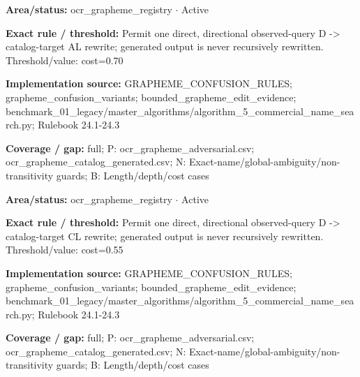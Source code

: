\begin{tcolorbox}[enhanced,breakable,colback=white,colframe=Muted!45,boxrule=0.45pt,arc=1.5pt,left=6pt,right=6pt,top=5pt,bottom=5pt,title={\texttt{OCR-GRAPHEME-D-TO-AL}},title after break={\texttt{OCR-GRAPHEME-D-TO-AL}\ (continued)},fonttitle=\headingfont\bfseries\color{Navy},coltitle=Navy]
\textbf{Area/status:} ocr\_\allowbreak{}grapheme\_\allowbreak{}registry $\boldsymbol{\cdot}$ Active\par
\smallskip
\textbf{Exact rule / threshold:} Permit one direct, directional observed-query D -> catalog-target AL rewrite; generated output is never recursively rewritten. Threshold/\allowbreak{}value: cost=0.70\par
\smallskip
\textbf{Implementation source:} GRAPHEME\_\allowbreak{}CONFUSION\_\allowbreak{}RULES; grapheme\_\allowbreak{}confusion\_\allowbreak{}variants; bounded\_\allowbreak{}grapheme\_\allowbreak{}edit\_\allowbreak{}evidence; benchmark\_\allowbreak{}01\_\allowbreak{}legacy/\allowbreak{}master\_\allowbreak{}algorithms/\allowbreak{}algorithm\_\allowbreak{}5\_\allowbreak{}commercial\_\allowbreak{}name\_\allowbreak{}search.py; Rulebook 24.1-24.3\par
\smallskip
\textbf{Coverage / gap:} full; P: ocr\_\allowbreak{}grapheme\_\allowbreak{}adversarial.csv; ocr\_\allowbreak{}grapheme\_\allowbreak{}catalog\_\allowbreak{}generated.csv; N: Exact-name/\allowbreak{}global-ambiguity/\allowbreak{}non-transitivity guards; B: Length/\allowbreak{}depth/\allowbreak{}cost cases
\end{tcolorbox}
\begin{tcolorbox}[enhanced,breakable,colback=white,colframe=Muted!45,boxrule=0.45pt,arc=1.5pt,left=6pt,right=6pt,top=5pt,bottom=5pt,title={\texttt{OCR-GRAPHEME-D-TO-CL}},title after break={\texttt{OCR-GRAPHEME-D-TO-CL}\ (continued)},fonttitle=\headingfont\bfseries\color{Navy},coltitle=Navy]
\textbf{Area/status:} ocr\_\allowbreak{}grapheme\_\allowbreak{}registry $\boldsymbol{\cdot}$ Active\par
\smallskip
\textbf{Exact rule / threshold:} Permit one direct, directional observed-query D -> catalog-target CL rewrite; generated output is never recursively rewritten. Threshold/\allowbreak{}value: cost=0.55\par
\smallskip
\textbf{Implementation source:} GRAPHEME\_\allowbreak{}CONFUSION\_\allowbreak{}RULES; grapheme\_\allowbreak{}confusion\_\allowbreak{}variants; bounded\_\allowbreak{}grapheme\_\allowbreak{}edit\_\allowbreak{}evidence; benchmark\_\allowbreak{}01\_\allowbreak{}legacy/\allowbreak{}master\_\allowbreak{}algorithms/\allowbreak{}algorithm\_\allowbreak{}5\_\allowbreak{}commercial\_\allowbreak{}name\_\allowbreak{}search.py; Rulebook 24.1-24.3\par
\smallskip
\textbf{Coverage / gap:} full; P: ocr\_\allowbreak{}grapheme\_\allowbreak{}adversarial.csv; ocr\_\allowbreak{}grapheme\_\allowbreak{}catalog\_\allowbreak{}generated.csv; N: Exact-name/\allowbreak{}global-ambiguity/\allowbreak{}non-transitivity guards; B: Length/\allowbreak{}depth/\allowbreak{}cost cases
\end{tcolorbox}
